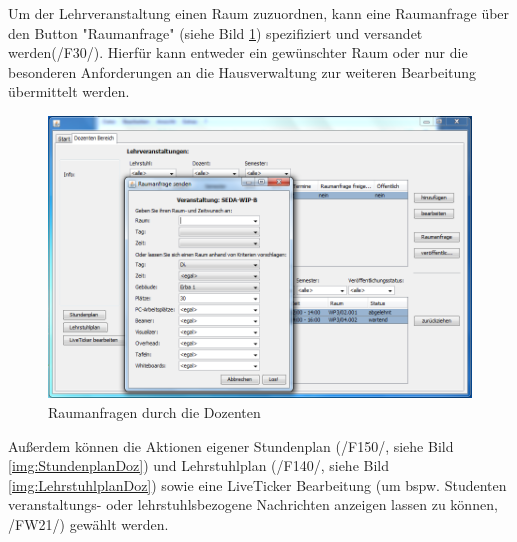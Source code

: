 Um der Lehrveranstaltung einen Raum zuzuordnen, kann eine Raumanfrage über den Button "Raumanfrage" (siehe Bild \ref{img:RaumanfrageDoz}) spezifiziert und versandet werden(/F30/). Hierfür kann entweder ein gewünschter Raum oder nur die besonderen Anforderungen an die Hausverwaltung zur weiteren Bearbeitung übermittelt werden.

\begin{figure}[H]
\begin{center}
\includegraphics[width=150mm]{images/section_7/DozentenRaumanfrage.PNG}
\caption{Raumanfragen durch die Dozenten}
\label{img:RaumanfrageDoz}
\end{center}
\end{figure}

Außerdem können die Aktionen eigener Stundenplan (/F150/, siehe Bild \ref{img:StundenplanDoz}) und Lehrstuhlplan (/F140/, siehe Bild \ref{img:LehrstuhlplanDoz}) sowie eine LiveTicker Bearbeitung (um bspw. Studenten veranstaltungs- oder lehrstuhlsbezogene Nachrichten anzeigen lassen zu können, /FW21/) gewählt werden.